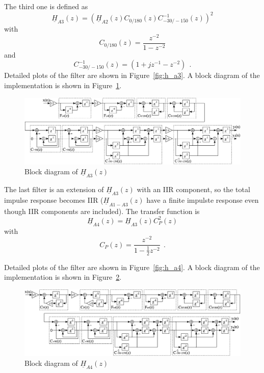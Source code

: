 \documentclass[a4paper,BCOR7mm,12pt,pointlessnumbers,bibtotoc]{scrartcl}
\begin{document}
The third one is defined as 
\begin{equation}	
  \underline{H}_{A3}(z) = \left(\underline{H}_{A2}(z)C_{0/180}(z)C^{-1}_{-30/-150}(z)\right)^{2}
\end{equation}
with
\begin{equation}	
  C_{0/180}(z) = \frac{z^{-2}}{1 - z^{-2}}
\end{equation}
and
\begin{equation}	
  C^{-1}_{-30/-150}(z) = (1 + j z^{-1} - z^{-2}) \ \ .
\end{equation}
Detailed plots of the filter are shown in Figure~\ref{fig:h_a3}. A block diagram of the implementation is shown in Figure~\ref{fig:block_impl_h_a3}.

\begin{figure}[H]
  \includegraphics[width=15 cm]{images/block_impl_h_a3}
  \caption{Block diagram of  $\underline{H}_{A3}(z)$}
  \label{fig:block_impl_h_a3}
\end{figure}

The last filter is an extension of $\underline{H}_{A3}(z)$ with an IIR component, so the total impulse response becomes IIR ($\underline{H}_{A1-A3}(z)$ have a finite impulste response even though IIR components are included). The transfer function is
\begin{equation}
  \underline{H}_{A4}(z) = \underline{H}_{A3}(z) C_{P}^2(z)
\label{equ:fsf_ha4_cp}
\end{equation}
with
\begin{equation}	
  C_{P}(z) = \frac{z^{-2}}{1-\frac{1}{2} z^{-2}} \ \ .
\label{equ:cp}
\end{equation}

Detailed plots of the filter are shown in Figure~\ref{fig:h_a4}. A block diagram of the implementation is shown in Figure~\ref{fig:block_impl_h_a4}.

\begin{figure}[H]
	\includegraphics[width=15 cm]{images/block_impl_h_a4}
	\caption{Block diagram of  $\underline{H}_{A4}(z)$}
	\label{fig:block_impl_h_a4}
\end{figure}
\end{document}
